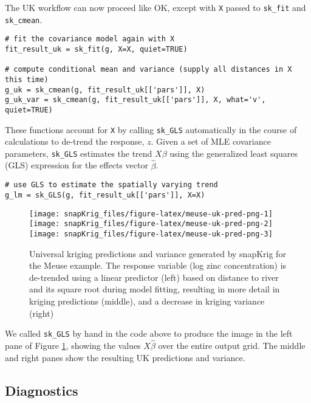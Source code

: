 The UK workflow can now proceed like OK, except with \texttt{X} passed to \texttt{sk\_fit} and \texttt{sk\_cmean}.

\begin{verbatim}
# fit the covariance model again with X
fit_result_uk = sk_fit(g, X=X, quiet=TRUE)

# compute conditional mean and variance (supply all distances in X this time)
g_uk = sk_cmean(g, fit_result_uk[['pars']], X)
g_uk_var = sk_cmean(g, fit_result_uk[['pars']], X, what='v', quiet=TRUE)
\end{verbatim}

These functions account for \texttt{X} by calling \texttt{sk\_GLS} automatically in the course of calculations to de-trend the response, \(z\). Given a set of MLE covariance parameters, \texttt{sk\_GLS} estimates the trend \(X\beta\) using the generalized least squares (GLS) expression for the effects vector \(\hat{\beta}\).

\begin{verbatim}
# use GLS to estimate the spatially varying trend 
g_lm = sk_GLS(g, fit_result_uk[['pars']], X=X)
\end{verbatim}

\begin{figure}
\texttt{[image: snapKrig\_files/figure-latex/meuse-uk-pred-png-1]} \texttt{[image: snapKrig\_files/figure-latex/meuse-uk-pred-png-2]} \texttt{[image: snapKrig\_files/figure-latex/meuse-uk-pred-png-3]} \caption{Universal kriging predictions and variance generated by snapKrig for the Meuse example. The response variable (log zinc concentration) is de-trended using a linear predictor (left) based on distance to river and its square root during model fitting, resulting in more detail in kriging predictions (middle), and a decrease in kriging variance (right)}\label{fig:meuse-uk-pred-png}
\end{figure}

We called \texttt{sk\_GLS} by hand in the code above to produce the image in the left pane of Figure \ref{fig:meuse-uk-pred-png}, showing the values \(X\hat{\beta}\) over the entire output grid. The middle and right panes show the resulting UK predictions and variance.

\hypertarget{diagnostics}{%
\subsection{Diagnostics}\label{diagnostics}}

